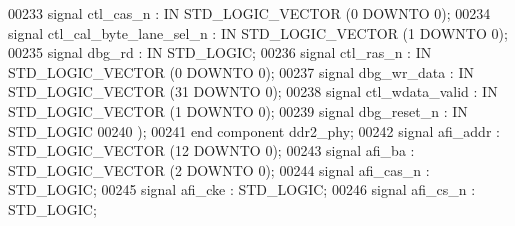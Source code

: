 \begin{DoxyCode}
00233         \textcolor{keywordflow}{signal} ctl_cas_n : \textcolor{keywordflow}{IN} \textcolor{comment}{STD\_LOGIC\_VECTOR} (\textcolor{vhdllogic}{}\textcolor{vhdllogic}{0} \textcolor{keywordflow}{DOWNTO} \textcolor{vhdllogic}{}\textcolor{vhdllogic}{0});
00234         \textcolor{keywordflow}{signal} ctl_cal_byte_lane_sel_n : \textcolor{keywordflow}{IN} \textcolor{comment}{STD\_LOGIC\_VECTOR} (\textcolor{vhdllogic}{}\textcolor{vhdllogic}{1} \textcolor{keywordflow}{DOWNTO} \textcolor{vhdllogic}{}\textcolor{vhdllogic}{0});
00235         \textcolor{keywordflow}{signal} dbg_rd : \textcolor{keywordflow}{IN} \textcolor{comment}{STD\_LOGIC};
00236         \textcolor{keywordflow}{signal} ctl_ras_n : \textcolor{keywordflow}{IN} \textcolor{comment}{STD\_LOGIC\_VECTOR} (\textcolor{vhdllogic}{}\textcolor{vhdllogic}{0} \textcolor{keywordflow}{DOWNTO} \textcolor{vhdllogic}{}\textcolor{vhdllogic}{0});
00237         \textcolor{keywordflow}{signal} dbg_wr_data : \textcolor{keywordflow}{IN} \textcolor{comment}{STD\_LOGIC\_VECTOR} (\textcolor{vhdllogic}{}\textcolor{vhdllogic}{31} \textcolor{keywordflow}{DOWNTO} \textcolor{vhdllogic}{}\textcolor{vhdllogic}{0});
00238         \textcolor{keywordflow}{signal} ctl_wdata_valid : \textcolor{keywordflow}{IN} \textcolor{comment}{STD\_LOGIC\_VECTOR} (\textcolor{vhdllogic}{}\textcolor{vhdllogic}{1} \textcolor{keywordflow}{DOWNTO} \textcolor{vhdllogic}{}\textcolor{vhdllogic}{0});
00239         \textcolor{keywordflow}{signal} dbg_reset_n : \textcolor{keywordflow}{IN} \textcolor{comment}{STD\_LOGIC}
00240       );
00241   \textcolor{keywordflow}{end} \textcolor{keywordflow}{component} \textcolor{vhdlchar}{ddr2_phy};
00242                 \textcolor{keywordflow}{signal} \textcolor{vhdlchar}{afi_addr} \textcolor{vhdlchar}{:}  \textcolor{comment}{STD\_LOGIC\_VECTOR} \textcolor{vhdlchar}{(}\textcolor{vhdllogic}{}\textcolor{vhdllogic}{12} \textcolor{keywordflow}{DOWNTO} \textcolor{vhdllogic}{}\textcolor{vhdllogic}{0}\textcolor{vhdlchar}{)};
00243                 \textcolor{keywordflow}{signal} \textcolor{vhdlchar}{afi_ba} \textcolor{vhdlchar}{:}  \textcolor{comment}{STD\_LOGIC\_VECTOR} \textcolor{vhdlchar}{(}\textcolor{vhdllogic}{}\textcolor{vhdllogic}{2} \textcolor{keywordflow}{DOWNTO} \textcolor{vhdllogic}{}\textcolor{vhdllogic}{0}\textcolor{vhdlchar}{)};
00244                 \textcolor{keywordflow}{signal} \textcolor{vhdlchar}{afi_cas_n} \textcolor{vhdlchar}{:}  \textcolor{comment}{STD\_LOGIC};
00245                 \textcolor{keywordflow}{signal} \textcolor{vhdlchar}{afi_cke} \textcolor{vhdlchar}{:}  \textcolor{comment}{STD\_LOGIC};
00246                 \textcolor{keywordflow}{signal} \textcolor{vhdlchar}{afi_cs_n} \textcolor{vhdlchar}{:}  \textcolor{comment}{STD\_LOGIC};

\end{DoxyCode}
